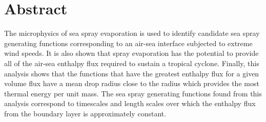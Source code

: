 \documentclass[17pt,a4paper]{article}
\begin{document}
\large

\section{Abstract}
The microphysics of sea spray evaporation is used to identify candidate sea spray generating functions corresponding to an air-sea interface subjected to extreme wind speeds. It is also shown that spray evaporation has the potential to provide all of the air-sea enthalpy flux required to sustain a tropical cyclone. Finally, this analysis shows that the functions that have the greatest enthalpy flux for a given volume flux have a mean drop radius close to the radius which provides the most thermal energy per unit mass. The sea spray generating functions found from this analysis correspond to timescales and length scales over which the enthalpy flux from the boundary layer is approximately constant. 
\end{document}
